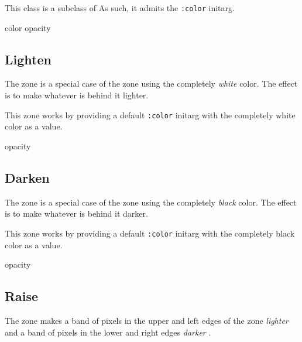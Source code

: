 This class is a subclass of 
  As such, it admits the
\texttt{:color} initarg. 


 {color opacity}

\subsection{Lighten}
\label{sec-zones-graphic-lighten}

The  zone is a special case of the 
zone   using the completely
\emph{white} color.  The effect is to make whatever is behind it
lighter.

This zone works by providing a default \texttt{:color} initarg with
the completely white color as a value. 



 {opacity}

\subsection{Darken}
\label{sec-zones-graphic-darken}

The  zone is a special case of the 
zone   using the completely
\emph{black} color.  The effect is to make whatever is behind it
darker.

This zone works by providing a default \texttt{:color} initarg with
the completely black color as a value. 



 {opacity}

\subsection{Raise}

The  zone makes a band of pixels in the upper and left
edges of the zone \emph{lighter}  and
a band of pixels in the lower and right edges \emph{darker}
. 




